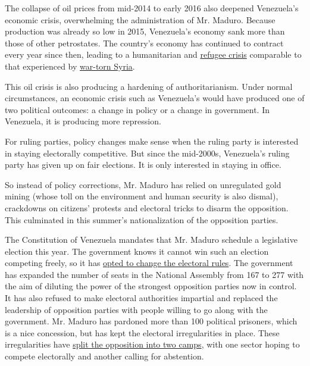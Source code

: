 The collapse of oil prices from mid-2014 to early 2016 also deepened
Venezuela's economic crisis, overwhelming the administration of Mr.
Maduro. Because production was already so low in 2015, Venezuela's
economy sank more than those of other petrostates. The country's economy
has continued to contract every year since then, leading to a
humanitarian and
\href{https://www.nytimes3xbfgragh.onion/2019/02/20/world/americas/venezuela-refugees-colombia.html}{refugee
crisis} comparable to that experienced by
\href{https://www.devex.com/news/venezuela-crisis-is-on-the-scale-of-syria-unhcr-says-93465}{war-torn
Syria}.

This oil crisis is also producing a hardening of authoritarianism. Under
normal circumstances, an economic crisis such as Venezuela's would have
produced one of two political outcomes: a change in policy or a change
in government. In Venezuela, it is producing more repression.

For ruling parties, policy changes make sense when the ruling party is
interested in staying electorally competitive. But since the mid-2000s,
Venezuela's ruling party has given up on fair elections. It is only
interested in staying in office.

So instead of policy corrections, Mr. Maduro has relied on unregulated
gold mining (whose toll on the environment and human security is also
dismal), crackdowns on citizens' protests and electoral tricks to disarm
the opposition. This culminated in this summer's nationalization of the
opposition parties.

The Constitution of Venezuela mandates that Mr. Maduro schedule a
legislative election this year. The government knows it cannot win such
an election competing freely, so it has
\href{https://www.hrw.org/news/2020/07/07/venezuela-rulings-threaten-free-and-fair-elections}{opted
to change the electoral rules}. The government has expanded the number
of seats in the National Assembly from 167 to 277 with the aim of
diluting the power of the strongest opposition parties now in control.
It has also refused to make electoral authorities impartial and replaced
the leadership of opposition parties with people willing to go along
with the government. Mr. Maduro has pardoned more than 100 political
prisoners, which is a nice concession, but has kept the electoral
irregularities in place. These irregularities have
\href{https://www.washingtonpost.com/world/the_americas/venezuelas-maduro-pardons-more-than-100-political-opponents-ahead-of-elections/2020/08/31/c5770df0-ebbf-11ea-b4bc-3a2098fc73d4_story.html}{split
the opposition into two camps}, with one sector hoping to compete
electorally and another calling for abstention.

